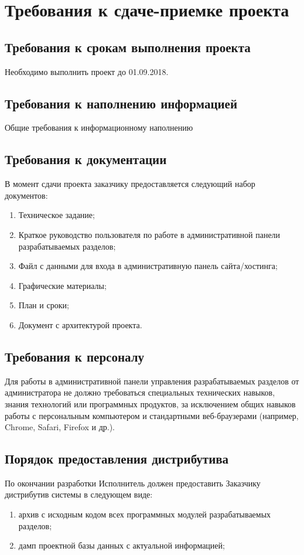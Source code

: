 \section{Требования к сдаче-приемке проекта}
\subsection{Требования к срокам выполнения проекта}
Необходимо выполнить проект до 01.09.2018. 
\subsection{Требования к наполнению информацией}
Общие требования к информационному наполнению

\subsection{Требования к документации}
В момент сдачи проекта заказчику предоставляется следующий набор документов:
\begin{enumerate}
  \item Техническое задание;
  \item Краткое руководство пользователя по работе в административной панели разрабатываемых разделов;
  \item Файл с данными для входа в административную панель сайта/хостинга;
  \item Графические материалы;
  \item План и сроки;
  \item Документ с архитектурой проекта.
\end{enumerate}

\subsection{Требования к персоналу}
Для работы в административной панели управления разрабатываемых разделов от администратора не должно требоваться специальных технических навыков, знания технологий или программных продуктов, за исключением общих навыков работы с персональным компьютером и стандартными веб-браузерами (например, Chrome, Safari, Firefox и др.).

\subsection{Порядок предоставления дистрибутива}
По окончании разработки Исполнитель должен предоставить Заказчику дистрибутив системы в следующем виде:
\begin{enumerate}
  \item архив с исходным кодом всех программных модулей разрабатываемых разделов;
  \item дамп проектной базы данных с актуальной информацией;
\end{enumerate}

